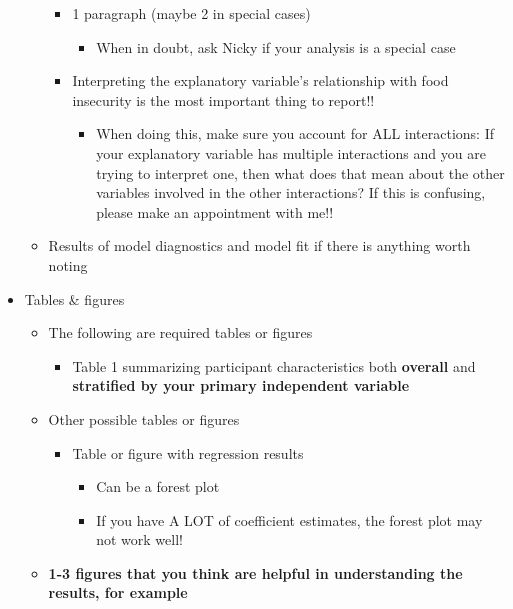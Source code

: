 \documentclass[
  letterpaper,
  DIV=11,
  numbers=noendperiod]{scrartcl}
\providecommand{\tightlist}{%
  \setlength{\itemsep}{0pt}\setlength{\parskip}{0pt}}\usepackage{longtable,booktabs,array}
\begin{document}
\begin{itemize}
\begin{itemize}
    \begin{itemize}
    \tightlist
    \item
      1 paragraph (maybe 2 in special cases)

      \begin{itemize}
      \tightlist
      \item
        When in doubt, ask Nicky if your analysis is a special case
      \end{itemize}
    \item
      Interpreting the explanatory variable's relationship with food
      insecurity is the most important thing to report!!

      \begin{itemize}
      \tightlist
      \item
        When doing this, make sure you account for ALL interactions: If
        your explanatory variable has multiple interactions and you are
        trying to interpret one, then what does that mean about the
        other variables involved in the other interactions? If this is
        confusing, please make an appointment with me!!
      \end{itemize}
    \end{itemize}
  \item
    Results of model diagnostics and model fit if there is anything
    worth noting
  \end{itemize}
\item
  Tables \& figures

  \begin{itemize}
  \tightlist
  \item
    The following are required tables or figures

    \begin{itemize}
    \tightlist
    \item
      Table 1 summarizing participant characteristics both
      \textbf{overall} and \textbf{stratified by your primary
      independent variable}
    \end{itemize}
  \item
    Other possible tables or figures

    \begin{itemize}
    \tightlist
    \item
      Table or figure with regression results

      \begin{itemize}
      \tightlist
      \item
        Can be a forest plot
      \item
        If you have A LOT of coefficient estimates, the forest plot may
        not work well!
      \end{itemize}
    \end{itemize}
  \item
    \textbf{1-3 figures that you think are helpful in understanding the
    results, for example}


\end{itemize}
\end{itemize}
\end{document}
